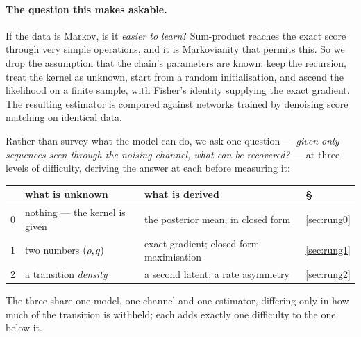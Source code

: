 \documentclass{article}
\theoremstyle{definition}
\theoremstyle{plain}
\begin{document}
\paragraph{The question this makes askable.} If the data is Markov, is it \emph{easier to learn}?
Sum-product reaches the exact score through very simple operations, and it is Markovianity that
permits this. So we drop the assumption that the chain's parameters are known: keep the recursion,
treat the kernel as unknown, start from a random initialisation, and ascend the likelihood on a
finite sample, with Fisher's identity supplying the exact gradient. The resulting estimator is
compared against networks trained by denoising score matching on identical data.

Rather than survey what the model can do, we ask one question --- \emph{given only sequences seen
through the noising channel, what can be recovered?} --- at three levels of difficulty, deriving
the answer at each before measuring it:

\begin{center}\small
\begin{tabular}{@{}clll@{}}
\toprule
 & what is unknown & what is derived & \S \\
\midrule
0 & nothing --- the kernel is given & the posterior mean, in closed form & \ref{sec:rung0} \\
1 & two numbers $(\rho,q)$ & exact gradient; closed-form maximisation & \ref{sec:rung1} \\
2 & a transition \emph{density} & a second latent; a rate asymmetry & \ref{sec:rung2} \\
\bottomrule
\end{tabular}
\end{center}

\noindent
The three share one model, one channel and one estimator, differing only in how much of the
transition is withheld; each adds exactly one difficulty to the one below it.
\end{document}
